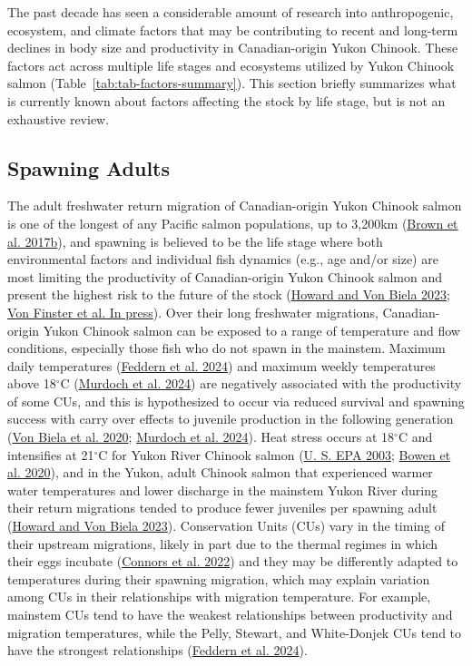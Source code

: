 \documentclass[11pt]{book}
\begin{document}
The past decade has seen a considerable amount of research into anthropogenic, ecosystem, and climate factors that may be contributing to recent and long-term declines in body size and productivity in Canadian-origin Yukon Chinook. These factors act across multiple life stages and ecosystems utilized by Yukon Chinook salmon (Table~\ref{tab:tab-factors-summary}). This section briefly summarizes what is currently known about factors affecting the stock by life stage, but is not an exhaustive review.

\hypertarget{spawning-adults}{%
\subsection{Spawning Adults}\label{spawning-adults}}

The adult freshwater return migration of Canadian-origin Yukon Chinook salmon is one of the longest of any Pacific salmon populations, up to 3,200km (\protect\hyperlink{ref-brown2017}{Brown et al. 2017b}), and spawning is believed to be the life stage where both environmental factors and individual fish dynamics (e.g., age and/or size) are most limiting the productivity of Canadian-origin Yukon Chinook salmon and present the highest risk to the future of the stock (\protect\hyperlink{ref-howard2023}{Howard and Von Biela 2023}; \protect\hyperlink{ref-vonfinster}{Von Finster et al. In press}). Over their long freshwater migrations, Canadian-origin Yukon Chinook salmon can be exposed to a range of temperature and flow conditions, especially those fish who do not spawn in the mainstem. Maximum daily temperatures (\protect\hyperlink{ref-feddern2024}{Feddern et al. 2024}) and maximum weekly temperatures above 18\(^\circ\)C (\protect\hyperlink{ref-murdoch2024}{Murdoch et al. 2024}) are negatively associated with the productivity of some CUs, and this is hypothesized to occur via reduced survival and spawning success with carry over effects to juvenile production in the following generation (\protect\hyperlink{ref-vonbiela2020}{Von Biela et al. 2020}; \protect\hyperlink{ref-murdoch2024}{Murdoch et al. 2024}). Heat stress occurs at 18\(^\circ\)C and intensifies at 21\(^\circ\)C for Yukon River Chinook salmon (\protect\hyperlink{ref-u.s.epa2003}{U. S. EPA 2003}; \protect\hyperlink{ref-bowen2020}{Bowen et al. 2020}), and in the Yukon, adult Chinook salmon that experienced warmer water temperatures and lower discharge in the mainstem Yukon River during their return migrations tended to produce fewer juveniles per spawning adult (\protect\hyperlink{ref-howard2023}{Howard and Von Biela 2023}). Conservation Units (CUs) vary in the timing of their upstream migrations, likely in part due to the thermal regimes in which their eggs incubate (\protect\hyperlink{ref-connors2022}{Connors et al. 2022}) and they may be differently adapted to temperatures during their spawning migration, which may explain variation among CUs in their relationships with migration temperature. For example, mainstem CUs tend to have the weakest relationships between productivity and migration temperatures, while the Pelly, Stewart, and White-Donjek CUs tend to have the strongest relationships (\protect\hyperlink{ref-feddern2024}{Feddern et al. 2024}).
\end{document}

